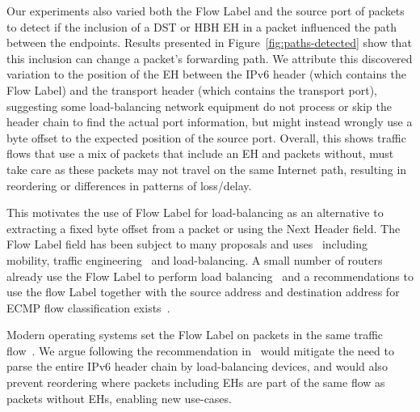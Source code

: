 \documentclass[conference]{IEEEtran}
\begin{document}

Our experiments also varied both the Flow Label and the source port of packets to detect if the inclusion of a DST or HBH EH in a packet influenced the path between the endpoints. Results presented in Figure~\ref{fig:paths-detected} show that this inclusion can change a packet's forwarding path. We attribute this discovered variation to the position of the EH between the IPv6 header (which contains the Flow Label) and the transport header (which contains the transport port), suggesting some load-balancing network equipment do not process or skip the header chain to find the actual port information, but might instead wrongly use a byte offset to the expected position of the source port. Overall, this shows traffic flows that use a mix of packets that include an EH and packets without, must take care as these packets may not travel on the same Internet path, resulting in reordering or differences in patterns of loss/delay. 

This motivates the use of Flow Label for load-balancing as an alternative to extracting a fixed byte offset from a packet or using the Next Header field. The Flow Label field has been subject to many proposals and uses~\cite{flow-label-approaches} including mobility, traffic engineering~\cite{traffic-eng} and load-balancing. A small number of routers already use the Flow Label to perform load balancing~\cite{lb-classification} and a recommendations to use the flow Label together with the source address and destination address for ECMP flow classification exists~\cite{RFC6437}.


Modern operating systems set the Flow Label on packets in the same traffic flow~\cite{os-fl}. We argue following the recommendation in~\cite{RFC6437} would mitigate the need to parse the entire IPv6 header chain by load-balancing devices, and would also prevent reordering where packets including EHs are part of the same flow as packets without EHs, enabling new use-cases. 

\end{document}
